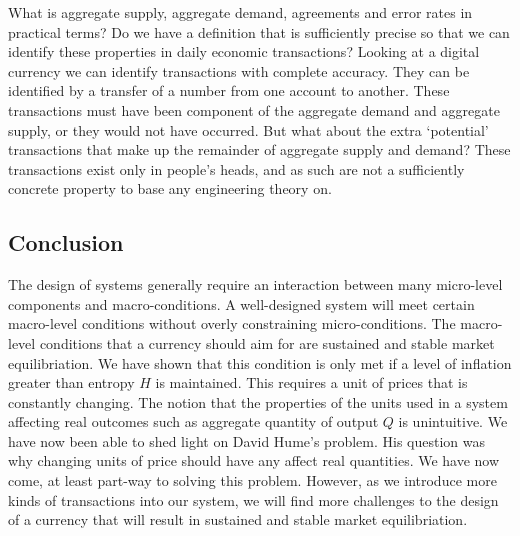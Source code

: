 What is aggregate supply, aggregate demand, agreements and error rates in practical terms? Do we
have a definition that is sufficiently precise so that we can identify these properties in daily
economic transactions? Looking at a digital currency we can identify transactions with complete
accuracy. They can be identified by a transfer of a number from one account to another. These
transactions must have been component of the aggregate demand and aggregate supply, or they would
not have occurred. But what about the extra `potential' transactions that make up the remainder of
aggregate supply and demand?  These transactions exist only in people's heads, and as such are not a
sufficiently concrete property to base any engineering theory on.




\subsection{Conclusion}

The design of systems generally require an interaction between many micro-level components and
macro-conditions. A well-designed system will meet certain macro-level conditions without overly
constraining micro-conditions. The macro-level conditions that a currency should aim for are
sustained and stable market equilibriation. We have shown that this condition is only met if a
level of inflation greater than entropy $H$ is maintained. This requires a unit of prices that is
constantly changing. The notion that the properties of the units used in a system affecting real
outcomes such as aggregate quantity of output $Q$ is unintuitive. We have now been able to shed
light on David Hume's problem. His question was why changing units of price should have any affect
real quantities. We have now come, at least part-way to solving this problem. However, as we
introduce more kinds of transactions into our system, we will find more challenges to the design of
a currency that will result in sustained and stable market equilibriation.  

